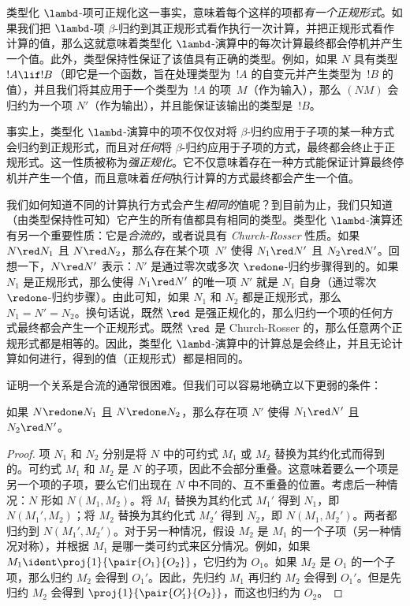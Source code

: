 \documentclass[../../../include/open-logic-section]{subfiles}
\begin{document}
类型化 $\lambd$-项可正规化这一事实，意味着每个这样的项都\emph{有一个正规形式}。如果我们把 $\lambd$-项 $\beta$-归约到其正规形式看作执行一次计算，并把正规形式看作计算的值，那么这就意味着类型化 $\lambd$-演算中的每次计算最终都会停机并产生一个值。此外，类型保持性保证了该值具有正确的类型。例如，如果 $N$ 具有类型 $!A \lif !B$（即它是一个函数，旨在处理类型为~$!A$ 的自变元并产生类型为~$!B$ 的值），并且我们将其应用于一个类型为~$!A$ 的项~$M$（作为输入），那么 $(NM)$ 会归约为一个项 $N'$（作为输出），并且能保证该输出的类型是~$!B$。

事实上，类型化 $\lambd$-演算中的项不仅仅对将 $\beta$-归约应用于子项的某一种方式会归约到正规形式，而且对\emph{任何}将 $\beta$-归约应用于子项的方式，最终都会终止于正规形式。这一性质被称为\emph{强正规化}。它不仅意味着存在一种方式能保证计算最终停机并产生一个值，而且意味着\emph{任何}执行计算的方式最终都会产生一个值。

我们如何知道不同的计算执行方式会产生\emph{相同的}值呢？到目前为止，我们只知道（由类型保持性可知）它产生的所有值都具有相同的类型。类型化 $\lambd$-演算还有另一个重要性质：它是\emph{合流的}，或者说具有 \emph{Church-Rosser} 性质。如果 $N \red N_1$ 且 $N \red N_2$，那么存在某个项~$N'$ 使得 $N_1 \red N'$ 且 $N_2 \red N'$。回想一下，$N \red N'$ 表示：$N'$ 是通过零次或多次 $\redone$-归约步骤得到的。如果 $N_1$ 是正规形式，那么使得 $N_1 \red N'$ 的唯一项 $N'$ 就是 $N_1$ 自身（通过零次 $\redone$-归约步骤）。由此可知，如果 $N_1$ 和 $N_2$ 都是正规形式，那么 $N_1 = N' = N_2$。换句话说，既然 $\red$ 是强正规化的，那么归约一个项的任何方式最终都会产生一个正规形式。既然 $\red$ 是 Church-Rosser 的，那么任意两个正规形式都是相等的。因此，类型化 $\lambd$-演算中的计算总是会终止，并且无论计算如何进行，得到的值（正规形式）都是相同的。

证明一个关系是合流的通常很困难。但我们可以容易地确立以下更弱的条件：

\begin{prop}
如果 $N \redone N_1$ 且 $N \redone N_2$，那么存在项 $N'$ 使得 $N_1 \red N'$ 且 $N_2 \red N'$。
\end{prop}

\begin{proof}
项 $N_1$ 和 $N_2$ 分别是将 $N$ 中的可约式 $M_1$ 或 $M_2$ 替换为其约化式而得到的。可约式 $M_1$ 和 $M_2$ 是 $N$ 的子项，因此不会部分重叠。这意味着要么一个项是另一个项的子项，要么它们出现在 $N$ 中不同的、互不重叠的位置。考虑后一种情况：$N$ 形如 $N(M_1,M_2)$。将 $M_1$ 替换为其约化式 $M_1'$ 得到 $N_1$，即 $N(M_1',M_2)$；将 $M_2$ 替换为其约化式 $M_2'$ 得到 $N_2$，即 $N(M_1,M_2')$。两者都归约到 $N(M_1',M_2')$。对于另一种情况，假设 $M_2$ 是 $M_1$ 的一个子项（另一种情况对称），并根据 $M_1$ 是哪一类可约式来区分情况。例如，如果 $M_1 \ident
  \proj{1}{\pair{O_1}{O_2}}$，它归约为 $O_1$。如果 $M_2$ 是 $O_1$ 的一个子项，那么归约 $M_2$ 会得到 $O_1'$。因此，先归约 $M_1$ 再归约 $M_2$ 会得到 $O_1'$。但是先归约 $M_2$ 会得到 $\proj{1}{\pair{O_1'}{O_2}}$，而这也归约为 $O_2$。
\end{proof}
\end{document}

